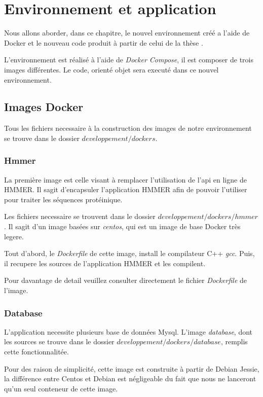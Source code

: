 \chapter{Environnement et application}
\label{ch:app}

Nous allons aborder, dans ce chapitre, le nouvel environnement créé a l'aide de Docker et le nouveau code produit à partir de celui de la thèse \thLeite.

L'environnement est réalisé à l'aide de \emph{Docker Compose}, il est composer de trois images différentes. Le code, orienté objet sera executé dans ce nouvel environnement.



\section{Images Docker}
Tous les fichiers necessaire à la construction des images de notre environnement se trouve dans le dossier \emph{$developpement/dockers$}.

\subsection{Hmmer}
La première image est celle visant à remplacer l'utilisation de l'\gls{api} en ligne de HMMER. Il sagit d'encapsuler l'application HMMER afin de pouvoir l'utiliser pour traiter les séquences protéinique.

Les fichiers necessaire se trouvent dans le dossier \emph{$developpement/dockers/hmmer$}. Il sagit d'un image basées sur \emph{centos}, qui est un image de base Docker très legere.

Tout d'abord, le \emph{Dockerfile} de cette image, install le compilateur C++ \emph{gcc}. Puis, il recupere les sources de l'application HMMER et les compilent.

Pour davantage de detail veuillez consulter directement le fichier \emph{Dockerfile} de l'image.

\subsection{Database}
L'application necessite plusieurs base de données Mysql. L'image \emph{database}, dont les sources se trouve dans le dossier \emph{$developpement/dockers/database$}, remplis cette fonctionnalitée.

Pour des raison de simplicité, cette image est construite à partir de Debian Jessie, la différence entre Centos et Debian est négligeable du fait que nous ne lanceront qu'un seul conteneur de cette image.

